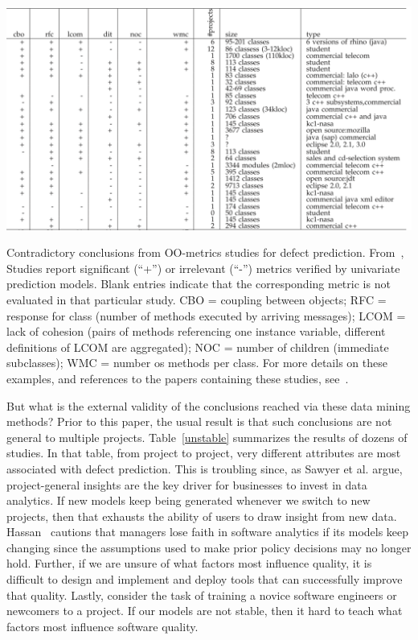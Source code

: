 \documentclass[10pt,journal,compsoc]{IEEEtran}
\begin{document}
\begin{table}
\begin{center}
\includegraphics[width=14cm]{figs/istable.png}
\end{center}
\caption{Contradictory conclusions from OO-metrics studies for defect prediction. From~\cite{menzies2012local}, Studies report significant (``+'') or irrelevant (``-'') metrics verified by univariate prediction models. Blank entries indicate that the corresponding metric is not evaluated in that particular study.   CBO = coupling between objects; RFC = response for class (number of methods executed by arriving messages); LCOM = lack of cohesion (pairs of methods referencing one instance variable, different definitions of LCOM are aggregated); NOC = number of children (immediate subclasses); WMC = number os methods per class. For more details on these examples, and references to the papers containing these studies, see~\cite{menzies2012local}.}
\label{unstable}
\end{table}

{\color{blue} But what is the external validity of the conclusions reached  via these data mining methods? Prior to this paper, the usual result is that such conclusions are not general to multiple projects. Table~\ref{unstable} summarizes the results of dozens of studies. In that table, from project to project, very different attributes are most associated with defect prediction. This is troubling since,   as
Sawyer et al. argue,   project-general
insights are the key driver for businesses to invest in data analytics. If  new models keep being generated whenever we switch to  new projects, then that exhausts the ability of  users to draw insight from  new data.
Hassan~\cite{Hassan17} cautions that managers lose faith in software analytics if its models keep changing since  the assumptions used to make prior policy decisions may no longer hold. 
 Further,
if we are unsure of what factors most influence quality, it is difficult to design and implement and deploy tools that can successfully improve that quality.
Lastly,
consider the task of training a   novice software engineers or newcomers to a project. If our models are not stable, then it hard to teach what factors  most influence software quality.}
\end{document}
